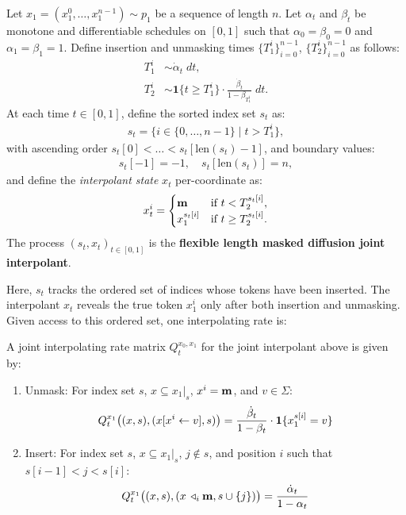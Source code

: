 \begin{appdefinition} \label{def:flexmdm-interpolant-def-appendix}
Let \(x_1 = (x_1^0, \dots, x_1^{n-1}) \sim p_1\) be a sequence of length \(n\). Let \(\alpha_t\) and \(\beta_t\) be monotone and differentiable schedules on \([0,1]\) such that \(\alpha_0 = \beta_0 = 0\) and \(\alpha_1 = \beta_1 = 1\).
Define insertion and unmasking times \(\{T_1^i\}_{i=0}^{n-1}\), \(\{T_2^i\}_{i=0}^{n-1}\) as follows:
\begin{align}
    T_1^i &\sim \dot{\alpha}_t \; dt, \\
    T_2^i &\sim \mathbf{1}\{t \geq T_1^i\} \cdot \frac{\dot{\beta}_t}{1 - \beta_{T_1^i}} \; dt.
\end{align}
At each time \(t \in [0,1]\), define the sorted index set $s_t$ as:
\begin{align}
    s_t = \{i \in \{0, \dots, n-1\} \mid t > T_1^i\},
\end{align}
with ascending order \(s_t[0] < \dots < s_t[\mathrm{len}(s_t)-1]\), and boundary values:
\begin{align}
    s_t[-1] = -1, \quad s_t[\mathrm{len}(s_t)] = n,
\end{align}
and define the  \textit{interpolant state} $x_t$ per-coordinate as:
\begin{align}
    x_t^i = 
    \begin{cases}
        \mathbf{m} & \text{if } t < T_2^{s_t[i]}, \\
        x_1^{s_t[i]} & \text{if } t \geq T_2^{s_t[i]}.
    \end{cases}
\end{align}
The process \((s_t, x_t)_{t \in [0,1]}\) is the \textbf{flexible length masked diffusion joint interpolant}.
\end{appdefinition}
Here, \(s_t\) tracks the ordered set of indices whose tokens have been inserted. The interpolant \(x_t\) reveals the true token \(x^i_1\) only after both insertion and unmasking. Given access to this ordered set, one interpolating rate is:
\begin{appprop} \label{prop:flex-mdm-interpolating-rate}
A joint interpolating rate matrix \(Q_t^{x_0, x_1}\) for the joint interpolant above is given by:
\begin{enumerate}[leftmargin=*,itemsep=0pt,topsep=0pt] 
\item Unmask: For index set $s$, \(x \subseteq {x_1}|_s\), \(x^i = \mathbf{m}\), and \(v \in \Sigma\):
\begin{align}
    Q_t^{x_1}\big((x, s), (x[x^{i} \leftarrow v], s)\big)
    = \frac{\dot{\beta}_t}{1 - \beta_t} \cdot \mathbf{1}\{x_1^{s[i]} = v\}
\end{align}

\item Insert: For index set $s$, \(x \subseteq {x_1}|_s\), \(j \notin s\), and position \(i\) such that \(s[i{-}1] < j < s[i]\):
\begin{align}
    Q_t^{x_1}\big((x, s), (x\,\triangleleft_{i}\mathbf{m}, s \cup \{j\})\big)
    = \frac{\dot{\alpha}_t}{1 - \alpha_t}
\end{align}
\end{enumerate}
\end{appprop}
